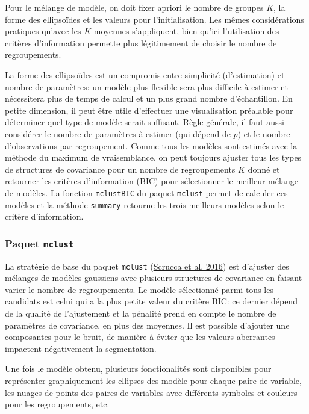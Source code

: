 \documentclass[
  11pt,
  letterpaper,
]{scrbook}
\theoremstyle{definition}
\theoremstyle{remark}
\begin{document}
Pour le mélange de modèle, on doit fixer apriori le nombre de groupes
\(K\), la forme des ellipsoïdes et les valeurs pour l'initialisation.
Les mêmes considérations pratiques qu'avec les \(K\)-moyennes
s'appliquent, bien qu'ici l'utilisation des critères d'information
permette plus légitimement de choisir le nombre de regroupements.

La forme des ellipsoïdes est un compromis entre simplicité
(d'estimation) et nombre de paramètres: un modèle plus flexible sera
plus difficile à estimer et nécessitera plus de temps de calcul et un
plus grand nombre d'échantillon. En petite dimension, il peut être utile
d'effectuer une visualisation préalable pour déterminer quel type de
modèle serait suffisant. Règle générale, il faut aussi considérer le
nombre de paramètres à estimer (qui dépend de \(p\)) et le nombre
d'observations par regroupement. Comme tous les modèles sont estimés
avec la méthode du maximum de vraisemblance, on peut toujours ajuster
tous les types de structures de covariance pour un nombre de
regroupements \(K\) donné et retourner les critères d'information (BIC)
pour sélectionner le meilleur mélange de modèles. La fonction
\texttt{mclustBIC} du paquet \texttt{mclust} permet de calculer ces
modèles et la méthode \texttt{summary} retourne les trois meilleurs
modèles selon le critère d'information.

\hypertarget{paquet-mclust}{%
\subsubsection{\texorpdfstring{Paquet
\texttt{mclust}}{Paquet mclust}}\label{paquet-mclust}}

La stratégie de base du paquet \texttt{mclust}
(\protect\hyperlink{ref-mclust5}{Scrucca et al. 2016}) est d'ajuster des
mélanges de modèles gaussiens avec plusieurs structures de covariance en
faisant varier le nombre de regroupements. Le modèle sélectionné parmi
tous les candidats est celui qui a la plus petite valeur du critère BIC:
ce dernier dépend de la qualité de l'ajustement et la pénalité prend en
compte le nombre de paramètres de covariance, en plus des moyennes. Il
est possible d'ajouter une composantes pour le bruit, de manière à
éviter que les valeurs aberrantes impactent négativement la
segmentation.

Une fois le modèle obtenu, plusieurs fonctionalités sont disponibles
pour représenter graphiquement les ellipses des modèle pour chaque paire
de variable, les nuages de points des paires de variables avec
différents symboles et couleurs pour les regroupements, etc.
\end{document}
